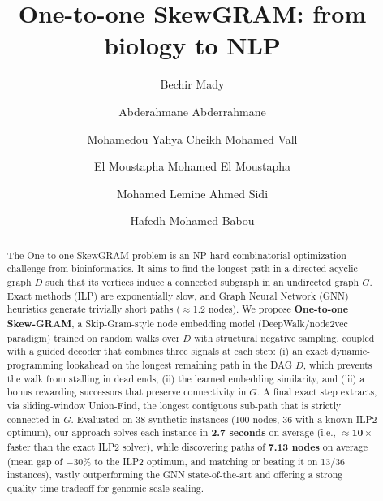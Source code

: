 \documentclass{llncs}
\begin{document}
\title{One-to-one SkewGRAM: from biology to NLP}
\author{
Bechir Mady \and
Abderahmane Abderrahmane \and
Mohamedou Yahya Cheikh Mohamed Vall \and
El Moustapha Mohamed El Moustapha \and
Mohamed Lemine Ahmed Sidi \and
Hafedh Mohamed Babou
}


\maketitle

\begin{abstract}
The One-to-one SkewGRAM problem is an NP-hard combinatorial optimization challenge from bioinformatics. It aims to find the longest path in a directed acyclic graph $D$ such that its vertices induce a connected subgraph in an undirected graph $G$. Exact methods (ILP) are exponentially slow, and Graph Neural Network (GNN) heuristics generate trivially short paths ($\approx$1.2 nodes). We propose \textbf{One-to-one Skew-GRAM}, a Skip-Gram-style node embedding model (DeepWalk/node2vec paradigm) trained on random walks over $D$ with structural negative sampling, coupled with a guided decoder that combines three signals at each step: (i) an exact dynamic-programming lookahead on the longest remaining path in the DAG $D$, which prevents the walk from stalling in dead ends, (ii) the learned embedding similarity, and (iii) a bonus rewarding successors that preserve connectivity in $G$. A final exact step extracts, via sliding-window Union-Find, the longest contiguous sub-path that is strictly connected in $G$. Evaluated on 38 synthetic instances (100 nodes, 36 with a known ILP2 optimum), our approach solves each instance in \textbf{2.7 seconds} on average (i.e., $\approx\mathbf{10\times}$ faster than the exact ILP2 solver), while discovering paths of \textbf{7.13 nodes} on average (mean gap of $-30\%$ to the ILP2 optimum, and matching or beating it on 13/36 instances), vastly outperforming the GNN state-of-the-art and offering a strong quality-time tradeoff for genomic-scale scaling.
\end{abstract}
\end{document}
